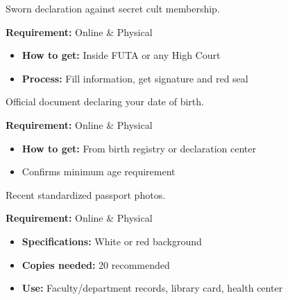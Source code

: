 \documentclass[11pt,a4paper]{article}
\begin{document}
\begin{tcolorbox}[colback=lightGray,colframe=primary,title={\color{white}\textbf{⚖️ Court Affidavit}},colbacktitle=primary,arc=4pt,breakable]
Sworn declaration against secret cult membership.

\textbf{Requirement:} \textcolor{successGreen}{Online \& Physical}

\begin{itemize}[leftmargin=1em, itemsep=0.2em]
    \item \textbf{How to get:} Inside FUTA or any High Court
    \item \textbf{Process:} Fill information, get signature and red seal
\end{itemize}
\end{tcolorbox}

\begin{tcolorbox}[colback=lightGray,colframe=primary,title={\color{white}\textbf{�� Birth Certificate}},colbacktitle=primary,arc=4pt,breakable]
Official document declaring your date of birth.

\textbf{Requirement:} \textcolor{successGreen}{Online \& Physical}

\begin{itemize}[leftmargin=1em, itemsep=0.2em]
    \item \textbf{How to get:} From birth registry or declaration center
    \item Confirms minimum age requirement
\end{itemize}
\end{tcolorbox}

\begin{tcolorbox}[colback=lightGray,colframe=primary,title={\color{white}\textbf{�� Passport Photographs}},colbacktitle=primary,arc=4pt,breakable]
Recent standardized passport photos.

\textbf{Requirement:} \textcolor{successGreen}{Online \& Physical}

\begin{itemize}[leftmargin=1em, itemsep=0.2em]
    \item \textbf{Specifications:} White or red background
    \item \textbf{Copies needed:} 20 recommended
    \item \textbf{Use:} Faculty/department records, library card, health center
\end{itemize}
\end{tcolorbox}
\end{document}
